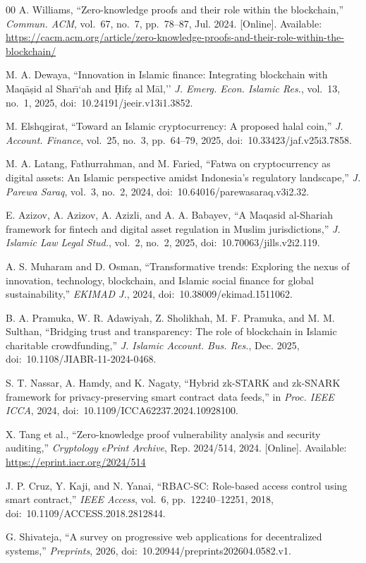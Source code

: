 \documentclass[conference]{IEEEtran}
\begin{document}
\begin{thebibliography}{00}
A. Williams, ``Zero-knowledge proofs and their role within the blockchain,'' \textit{Commun. ACM}, vol.~67, no.~7, pp.~78--87, Jul. 2024. [Online]. Available: \url{https://cacm.acm.org/article/zero-knowledge-proofs-and-their-role-within-the-blockchain/}

M. A. Dewaya, ``Innovation in Islamic finance: Integrating blockchain with Maq\={a}\d{s}id al Shar\={\i}`ah and \d{H}if\d{z} al M\={a}l,'' \textit{J. Emerg. Econ. Islamic Res.}, vol.~13, no.~1, 2025, doi:~10.24191/jeeir.v13i1.3852.

M. Elshqgirat, ``Toward an Islamic cryptocurrency: A proposed halal coin,'' \textit{J. Account. Finance}, vol.~25, no.~3, pp.~64--79, 2025, doi:~10.33423/jaf.v25i3.7858.

M. A. Latang, Fathurrahman, and M. Faried, ``Fatwa on cryptocurrency as digital assets: An Islamic perspective amidst Indonesia's regulatory landscape,'' \textit{J. Parewa Saraq}, vol.~3, no.~2, 2024, doi:~10.64016/parewasaraq.v3i2.32.

E. Azizov, A. Azizov, A. Azizli, and A. A. Babayev, ``A Maqasid al-Shariah framework for fintech and digital asset regulation in Muslim jurisdictions,'' \textit{J. Islamic Law Legal Stud.}, vol.~2, no.~2, 2025, doi:~10.70063/jills.v2i2.119.

A. S. Muharam and D. Osman, ``Transformative trends: Exploring the nexus of innovation, technology, blockchain, and Islamic social finance for global sustainability,'' \textit{EKIMAD J.}, 2024, doi:~10.38009/ekimad.1511062.

B. A. Pramuka, W. R. Adawiyah, Z. Sholikhah, M. F. Pramuka, and M. M. Sulthan, ``Bridging trust and transparency: The role of blockchain in Islamic charitable crowdfunding,'' \textit{J. Islamic Account. Bus. Res.}, Dec. 2025, doi:~10.1108/JIABR-11-2024-0468.

S. T. Nassar, A. Hamdy, and K. Nagaty, ``Hybrid zk-STARK and zk-SNARK framework for privacy-preserving smart contract data feeds,'' in \textit{Proc. IEEE ICCA}, 2024, doi:~10.1109/ICCA62237.2024.10928100.

X. Tang et al., ``Zero-knowledge proof vulnerability analysis and security auditing,'' \textit{Cryptology ePrint Archive}, Rep. 2024/514, 2024. [Online]. Available: \url{https://eprint.iacr.org/2024/514}

J. P. Cruz, Y. Kaji, and N. Yanai, ``RBAC-SC: Role-based access control using smart contract,'' \textit{IEEE Access}, vol.~6, pp.~12240--12251, 2018, doi:~10.1109/ACCESS.2018.2812844.

G. Shivateja, ``A survey on progressive web applications for decentralized systems,'' \textit{Preprints}, 2026, doi:~10.20944/preprints202604.0582.v1.

\end{thebibliography}
\end{document}
